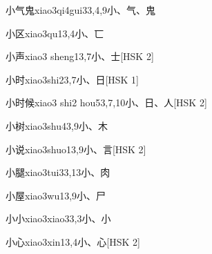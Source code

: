 \begin{entry}{小气鬼}{xiao3qi4gui3}{3,4,9}{⼩、⽓、⿁}
\end{entry}

\begin{entry}{小区}{xiao3qu1}{3,4}{⼩、⼖}
\end{entry}

\begin{entry}{小声}{xiao3 sheng1}{3,7}{⼩、⼠}[HSK 2]
\end{entry}

\begin{entry}{小时}{xiao3shi2}{3,7}{⼩、⽇}[HSK 1]
\end{entry}

\begin{entry}{小时候}{xiao3 shi2 hou5}{3,7,10}{⼩、⽇、⼈}[HSK 2]
\end{entry}

\begin{entry}{小树}{xiao3shu4}{3,9}{⼩、⽊}
\end{entry}

\begin{entry}{小说}{xiao3shuo1}{3,9}{⼩、⾔}[HSK 2]
\end{entry}

\begin{entry}{小腿}{xiao3tui3}{3,13}{⼩、⾁}
\end{entry}

\begin{entry}{小屋}{xiao3wu1}{3,9}{⼩、⼫}
\end{entry}

\begin{entry}{小小}{xiao3xiao3}{3,3}{⼩、⼩}
\end{entry}

\begin{entry}{小心}{xiao3xin1}{3,4}{⼩、⼼}[HSK 2]
\end{entry}

